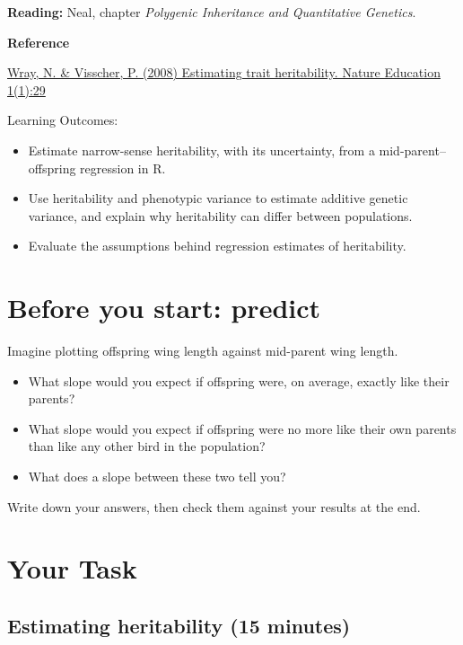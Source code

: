 \documentclass[
  a4paper]{book}
\providecommand{\tightlist}{%
  \setlength{\itemsep}{0pt}\setlength{\parskip}{0pt}}
\begin{document}
\textbf{Reading:} Neal, chapter \emph{Polygenic Inheritance and Quantitative Genetics}.

\textbf{Reference}

\href{https://www.nature.com/scitable/topicpage/estimating-trait-heritability-46889/}{Wray, N. \& Visscher, P. (2008) Estimating trait heritability. Nature Education 1(1):29}

Learning Outcomes:

\begin{itemize}
\tightlist
\item
  Estimate narrow-sense heritability, with its uncertainty, from a mid-parent--offspring regression in R.
\item
  Use heritability and phenotypic variance to estimate additive genetic variance, and explain why heritability can differ between populations.
\item
  Evaluate the assumptions behind regression estimates of heritability.
\end{itemize}

\section{Before you start: predict}\label{before-you-start-predict-2}

Imagine plotting offspring wing length against mid-parent wing length.

\begin{itemize}
\tightlist
\item
  What slope would you expect if offspring were, on average, exactly like their parents?
\item
  What slope would you expect if offspring were no more like their own parents than like any other bird in the population?
\item
  What does a slope between these two tell you?
\end{itemize}

Write down your answers, then check them against your results at the end.

\section{Your Task}\label{your-task-16}

\subsection{Estimating heritability (15 minutes)}\label{estimating-heritability-15-minutes}
\end{document}
